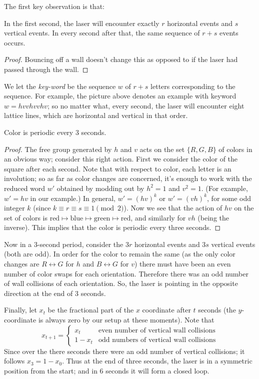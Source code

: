 \documentclass[11pt]{scrartcl}
\begin{document}
The first key observation is that:
\begin{claim*}
  In the first second, the laser will encounter exactly
  $r$ horizontal events and $s$ vertical events.
  In every second after that,
  the same sequence of $r+s$ events occurs.
\end{claim*}
\begin{proof}
  Bouncing off a wall doesn't change this
  as opposed to if the laser had passed through the wall.
\end{proof}
We let the \emph{key-word} be the sequence $w$ of $r+s$ letters
corresponding to the sequence.
For example, the picture above denotes an example
with keyword $w = hvvhvvhv$;
so no matter what, every second,
the laser will encounter eight lattice lines,
which are horizontal and vertical in that order.

\begin{claim*}
  Color is periodic every $3$ seconds.
\end{claim*}
\begin{proof}
  The free group generated by $h$ and $v$
  acts on the set $\{R,G,B\}$ of colors in an obvious way;
  consider this right action.
  First we consider the color of the square after each second.
  Note that with respect to color,
  each letter is an involution;
  so as far as color changes are concerned,
  it's enough to work with the reduced word $w'$
  obtained by modding out by $h^2 = 1$ and $v^2 = 1$.
  (For example, $w' = hv$ in our example.)
  In general, $w' = (hv)^k$ or $w' = (vh)^k$,
  for some odd integer $k$ (since $k \equiv r \equiv s \equiv 1 \pmod 2$).
  Now we see that the action of $hv$
  on the set of colors is
  $\text{red} \mapsto \text{blue} \mapsto \text{green} \mapsto \text{red}$,
  and similarly for $vh$ (being the inverse).
  This implies that the color is periodic every three seconds.
\end{proof}

Now in a 3-second period,
consider the $3r$ horizontal events
and $3s$ vertical events (both are odd).
In order for the color to remain the same
(as the only color changes are $R \leftrightarrow G$ for $h$
and $B \leftrightarrow G$ for $v$)
there must have been an even number of color swaps for each orientation.
Therefore there was an odd number of wall collisions of each orientation.
So, the laser is pointing in the opposite direction at the end of 3 seconds.

Finally, let $x_t$ be the fractional part of the $x$
coordinate after $t$ seconds
(the $y$-coordinate is always zero by our setup at these moments).
Note that
\[ x_{t+1} =
  \begin{cases}
    x_t & \text{even number of vertical wall collisions} \\
    1 - x_t & \text{odd numbers of vertical wall collisions}
  \end{cases}
\]
Since over the there seconds there were
an odd number of vertical collisions;
it follows $x_3 = 1 - x_0$.
Thus at the end of three seconds,
the laser is in a symmetric position
from the start;
and in $6$ seconds it will form a closed loop.
\pagebreak
\end{document}

